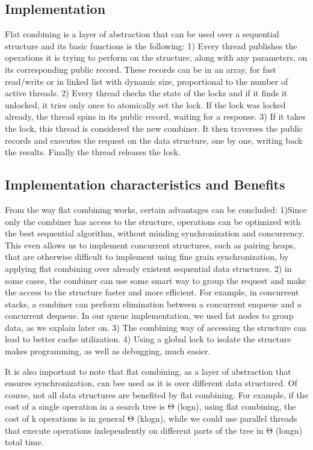 \subsection{Implementation}

Flat combining is a layer of abstraction that can be used over a sequential structure and its basic functions is the following:
1) Every thread publishes the operations it is trying to perform on the structure, along with any parameters, on its corresponding public record. These records can be in an array, for fast read/write or in linked list with dynamic size, proportional to the number of active threads.
2) Every thread checks the state of the locks and if it finds it unlocked, it tries only once to atomically set the lock. If the lock was locked already, the thread spins in its public record, waiting for a response.
3) If it takes the lock, this thread is considered the new combiner. It then traverses the public records and executes the request on the data structure, one by one, writing back the results. Finally the thread releases the lock.


\subsection{Implementation characteristics and Benefits}
From the way flat combining works, certain advantages can be concluded:
1)Since only the combiner has access to the structure, operations can be optimized with the best sequential algorithm, without minding synchronization and concurrency. This even allows us to implement concurrent structures, such as pairing heaps, that are otherwise difficult to implement using fine grain synchronization, by applying flat combining over already existent sequential data structures.
2) in some cases, the combiner can use some smart way to group the request and make the access to the structure faster and more efficient. For example, in concurrent stacks, a combiner can perform elimination between a concurrent enqueue and a concurrent dequeue. In our queue implementation, we used fat nodes to group data, as we explain later on.
3) The combining way of accessing the structure can lead to better cache utilization.
4) Using a global lock to isolate the structure makes programming, as well as debugging, much easier.

It is also important to note that flat combining, as a layer of abstraction that ensures synchronization, can bee used as it is over different data structured. Of course, not all data structures are benefited by flat combining. For example, if the cost of a single operation in a search tree is \textgreek{Θ} (logn), using flat combining, the cost of k operations is in general \textgreek{Θ} (klogn), while we could  use parallel threads that execute operations independently on different parts of the tree in \textgreek{Θ} (longn) total time.

